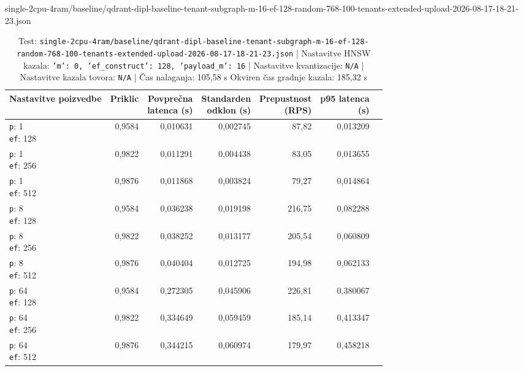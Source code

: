 \begin{table}[htbp]
  \centering
\small
  \caption{single-2cpu-4ram/baseline/qdrant-dipl-baseline-tenant-subgraph-m-16-ef-128-random-768-100-tenants-extended-upload-2026-08-17-18-21-23.json}
  \label{tab:single-2cpu-4ram:baseline:qdrant-dipl-baseline-tenant-subgraph-m-16-ef-128-random-768-100-tenants-extended-upload-2026-08-17-18-21-23.json}
  \begin{tabularx}{\textwidth}{Xrrrrrr}
    \toprule
    Nastavitve poizvedbe & Priklic & \makecell{Povprečna\\latenca (s)} & \makecell{Standarden\\odklon (s)} & \makecell{Prepustnost\\(RPS)} & \makecell{p95 latenca\\(s)}  \\
    \midrule
    \makecell{\texttt{p}: 1\\\texttt{ef}: 128} & 0,9584 & 0,010631 & 0,002745 & 87,82 & 0,013209 \\
    \makecell{\texttt{p}: 1\\\texttt{ef}: 256} & 0,9822 & 0,011291 & 0,004438 & 83,05 & 0,013655 \\
    \makecell{\texttt{p}: 1\\\texttt{ef}: 512} & 0,9876 & 0,011868 & 0,003824 & 79,27 & 0,014864 \\
    \makecell{\texttt{p}: 8\\\texttt{ef}: 128} & 0,9584 & 0,036238 & 0,019198 & 216,75 & 0,082288 \\
    \makecell{\texttt{p}: 8\\\texttt{ef}: 256} & 0,9822 & 0,038252 & 0,013177 & 205,54 & 0,060809 \\
    \makecell{\texttt{p}: 8\\\texttt{ef}: 512} & 0,9876 & 0,040404 & 0,012725 & 194,98 & 0,062133 \\
    \makecell{\texttt{p}: 64\\\texttt{ef}: 128} & 0,9584 & 0,272305 & 0,045906 & 226,81 & 0,380067 \\
    \makecell{\texttt{p}: 64\\\texttt{ef}: 256} & 0,9822 & 0,334649 & 0,059459 & 185,14 & 0,413347 \\
    \makecell{\texttt{p}: 64\\\texttt{ef}: 512} & 0,9876 & 0,344215 & 0,060974 & 179,97 & 0,458218 \\
    \bottomrule
  \end{tabularx}
\caption* {Test: \texttt{single-2cpu-4ram/baseline/qdrant-dipl-baseline-tenant-subgraph-m-16-ef-128-random-768-100-tenants-extended-upload-2026-08-17-18-21-23.json} | Nastavitve HNSW kazala: \texttt{{'m': 0, 'ef\_construct': 128, 'payload\_m': 16}} | Nastavitve kvantizacije: \texttt{N/A} | Nastavitve kazala tovora: \texttt{N/A} | Čas nalaganja: 105,58 s Okviren čas gradnje kazala: 185,32 s}\end{table}


